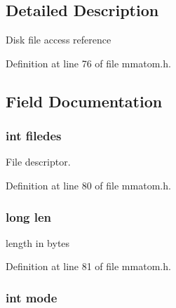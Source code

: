 \subsection{Detailed Description}
Disk file access reference 

Definition at line 76 of file mmatom.\-h.



\subsection{Field Documentation}
\hypertarget{struct_m_m_a___d_i_s_k___f_i_l_e___r_e_f_ac657804269d18c2152f07bc54c20874d}{
\subsubsection[{filedes}]{\setlength{\rightskip}{0pt plus 5cm}int filedes}}\label{struct_m_m_a___d_i_s_k___f_i_l_e___r_e_f_ac657804269d18c2152f07bc54c20874d}


File descriptor. 



Definition at line 80 of file mmatom.\-h.

\hypertarget{struct_m_m_a___d_i_s_k___f_i_l_e___r_e_f_aaccba9d5adc3f6c39aad767db95ba484}{
\subsubsection[{len}]{\setlength{\rightskip}{0pt plus 5cm}long len}}\label{struct_m_m_a___d_i_s_k___f_i_l_e___r_e_f_aaccba9d5adc3f6c39aad767db95ba484}


length in bytes 



Definition at line 81 of file mmatom.\-h.

\hypertarget{struct_m_m_a___d_i_s_k___f_i_l_e___r_e_f_a1ea5d0cb93f22f7d0fdf804bd68c3326}{
\subsubsection[{mode}]{\setlength{\rightskip}{0pt plus 5cm}int mode}}\label{struct_m_m_a___d_i_s_k___f_i_l_e___r_e_f_a1ea5d0cb93f22f7d0fdf804bd68c3326}


